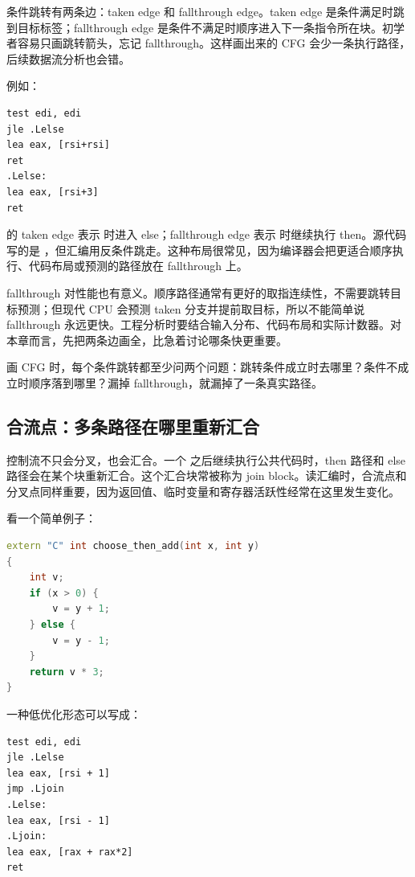 条件跳转有两条边：taken edge 和 fallthrough edge。taken edge 是条件满足时跳到目标标签；fallthrough edge 是条件不满足时顺序进入下一条指令所在块。初学者容易只画跳转箭头，忘记 fallthrough。这样画出来的 CFG 会少一条执行路径，后续数据流分析也会错。

例如：

\begin{lstlisting}
test edi, edi
jle .Lelse
lea eax, [rsi+rsi]
ret
.Lelse:
lea eax, [rsi+3]
ret
\end{lstlisting}

 的 taken edge 表示  时进入 else；fallthrough edge 表示  时继续执行 then。源代码写的是 ，但汇编用反条件跳走。这种布局很常见，因为编译器会把更适合顺序执行、代码布局或预测的路径放在 fallthrough 上。

fallthrough 对性能也有意义。顺序路径通常有更好的取指连续性，不需要跳转目标预测；但现代 CPU 会预测 taken 分支并提前取目标，所以不能简单说 fallthrough 永远更快。工程分析时要结合输入分布、代码布局和实际计数器。对本章而言，先把两条边画全，比急着讨论哪条快更重要。

\begin{keyidea}
画 CFG 时，每个条件跳转都至少问两个问题：跳转条件成立时去哪里？条件不成立时顺序落到哪里？漏掉 fallthrough，就漏掉了一条真实路径。
\end{keyidea}

\subsection{合流点：多条路径在哪里重新汇合}

控制流不只会分叉，也会汇合。一个  之后继续执行公共代码时，then 路径和 else 路径会在某个块重新汇合。这个汇合块常被称为 join block。读汇编时，合流点和分叉点同样重要，因为返回值、临时变量和寄存器活跃性经常在这里发生变化。

看一个简单例子：

\begin{lstlisting}[language=C++]
extern "C" int choose_then_add(int x, int y)
{
    int v;
    if (x > 0) {
        v = y + 1;
    } else {
        v = y - 1;
    }
    return v * 3;
}
\end{lstlisting}

一种低优化形态可以写成：

\begin{lstlisting}
test edi, edi
jle .Lelse
lea eax, [rsi + 1]
jmp .Ljoin
.Lelse:
lea eax, [rsi - 1]
.Ljoin:
lea eax, [rax + rax*2]
ret
\end{lstlisting}

